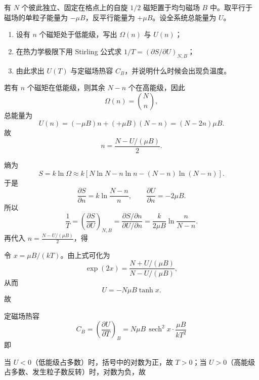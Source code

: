\begin{question}[18分]
有 $N$ 个彼此独立、固定在格点上的自旋 $1/2$ 磁矩置于均匀磁场 $B$ 中。取平行于磁场的单粒子能量为 $-\mu B$，反平行能量为 $+\mu B$。设全系统总能量为 $U$。
\begin{enumerate}[label=（\arabic*）,leftmargin=2.8em,itemsep=0.2em]
\item 设有 $n$ 个磁矩处于低能级，写出 $\Omega(n)$ 与 $U(n)$；
\item 在热力学极限下用 Stirling 公式求 $1/T=(\partial S/\partial U)_{N,B}$；
\item 由此求出 $U(T)$ 与定磁场热容 $C_B$，并说明什么时候会出现负温度。
\end{enumerate}
\begin{solution}

若有 $n$ 个磁矩在低能级，则其余 $N-n$ 个在高能级，因此
\[
\Omega(n)=\binom{N}{n},
\]
总能量为
\[
U(n)=(-\mu B)n+(+\mu B)(N-n)=(N-2n)\mu B.
\]
故
\[
n=\frac{N-U/(\mu B)}{2}.
\]

熵为
\[
S=k\ln \Omega
\approx k\left[N\ln N-n\ln n-(N-n)\ln(N-n)\right].
\]
于是
\[
\frac{\partial S}{\partial n}
=k\ln\frac{N-n}{n},
\qquad
\frac{\partial U}{\partial n}=-2\mu B.
\]
所以
\[
\frac{1}{T}
=\left(\frac{\partial S}{\partial U}\right)_{N,B}
=\frac{\partial S/\partial n}{\partial U/\partial n}
=\frac{k}{2\mu B}\ln\frac{n}{N-n}.
\]
再代入 $n=\frac{N-U/(\mu B)}{2}$，得

令 $x=\mu B/(kT)$。由上式可化为
\[
\exp(2x)=\frac{N+U/(\mu B)}{N-U/(\mu B)},
\]
从而
\[
U=-N\mu B\tanh x.
\]
故

定磁场热容
\[
C_B=\left(\frac{\partial U}{\partial T}\right)_B
=N\mu B\,\operatorname{sech}^2 x\cdot \frac{\mu B}{kT^2}
\]
即

当 $U<0$（低能级占多数）时，括号中的对数为正，故 $T>0$；当 $U>0$（高能级占多数、发生粒子数反转）时，对数为负，故
\end{solution}
\end{question}


